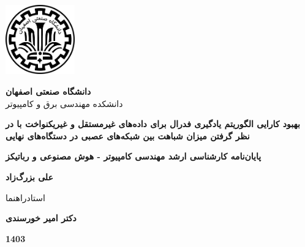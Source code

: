 \thispagestyle{empty}
\begin{center}
\includegraphics[height=3cm]{iut_logo.png}
\vspace{0.4cm}

{\large
	\textbf{دانشگاه صنعتی اصفهان}\\
	دانشکده مهندسی برق و کامپیوتر
}
\vspace{3.5cm}

{\LARGE
	\textbf{
	بهبود کارایی الگوریتم یادگیری فدرال برای داده‌های غیرمستقل و غیریکنواخت با در نظر گرفتن میزان شباهت بین شبکه‌های عصبی در دستگاه‌های نهایی
	}
	\\
}
\vspace{3.5cm}

{\large
	\textbf{پایان‌نامه کارشناسی ارشد مهندسی کامپیوتر - هوش مصنوعی و رباتیکز}
}
\vspace{1cm}

{\Large
	\textbf{علی بزرگ‌زاد}\\
}
\vspace{2.5cm}

{\large
	استادراهنما\\
}
\vspace{0.5cm}

{\Large
	\textbf{دکتر امیر خورسندی}\\
}
\vspace{3.5cm}

{\Large
	\textbf{1403}
}

\end{center}
\restoregeometry
\pagebreak




%
%
%	
%


\thispagestyle{empty}
\vspace*{3cm}

